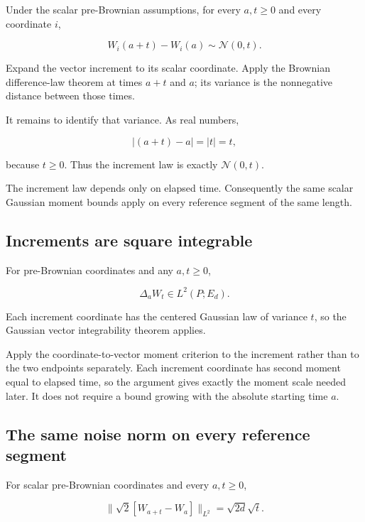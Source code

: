 \documentclass[11pt,a4paper]{report}
\begin{document}
Under the scalar pre-Brownian assumptions, for every \(a,t\ge0\) and every coordinate \(i\),

\[W_i(a+t)-W_i(a)\sim\mathcal N(0,t).\]

Expand the vector increment to its scalar coordinate. Apply the Brownian difference-law theorem at times \(a+t\) and \(a\); its variance is the nonnegative distance between those times.



It remains to identify that variance. As real numbers,

\[|(a+t)-a|=|t|=t,\]

because \(t\ge0\). Thus the increment law is exactly \(\mathcal N(0,t)\).



The increment law depends only on elapsed time. Consequently the same scalar Gaussian moment bounds apply on every reference segment of the same length.

\subsection{\texorpdfstring{Increments are square integrable}{Increments are square integrable}}
\label{report-step-UnadjustedLangevin-GaussianMoments-lean-13}


For pre-Brownian coordinates and any \(a,t\ge0\),

\[\Delta_aW_t\in L^2(P;E_d).\]

Each increment coordinate has the centered Gaussian law of variance \(t\), so the Gaussian vector integrability theorem applies.



Apply the coordinate-to-vector moment criterion to the increment rather than to the two endpoints separately. Each increment coordinate has second moment equal to elapsed time, so the argument gives exactly the moment scale needed later. It does not require a bound growing with the absolute starting time \(a\).

\subsection{\texorpdfstring{The same noise norm on every reference segment}{The same noise norm on every reference segment}}
\label{report-step-UnadjustedLangevin-GaussianMoments-lean-14}


For scalar pre-Brownian coordinates and every \(a,t\ge0\),

\[\boxed{\|\sqrt2[W_{a+t}-W_a]\|_{L^2}=\sqrt{2d}\sqrt t.}\]
\end{document}
